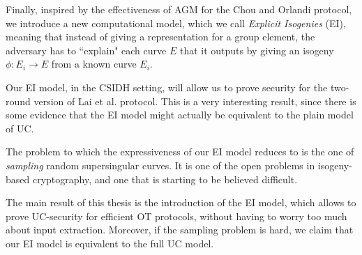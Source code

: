 Finally, inspired by the effectiveness of AGM for the Chou and Orlandi protocol, we introduce a new computational model, which we call \emph{Explicit Isogenies} (EI), meaning that instead of giving a representation for a group element, the adversary has to ``explain" each curve $E$ that it outputs by giving an isogeny $\phi:E_i\to E$ from a known curve $E_i$.

Our EI model, in the CSIDH setting, will allow us to prove security for the two-round version of Lai et al. protocol. This is a very interesting result, since there is some evidence that the EI model might actually be equivalent to the plain model of UC.

The problem to which the expressiveness of our EI model reduces to is the one of \emph{sampling} random supersingular curves. It is one of the open problems in isogeny-based cryptography, and one that is starting to be believed difficult.

The main result of this thesis is the introduction of the EI model, which allows to prove UC-security for efficient OT protocols, without having to worry too much about input extraction. Moreover, if the sampling problem is hard, we claim that our EI model is equivalent to the full UC model.

